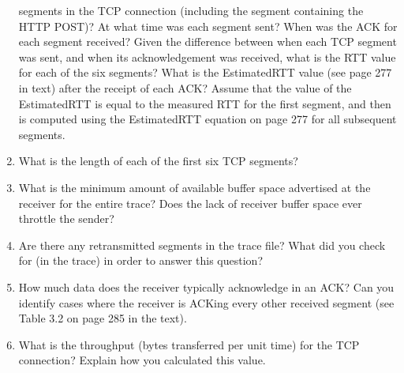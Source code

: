 \documentclass[10pt]{article}
\begin{document}
\begin{enumerate}
{  segments in the TCP connection (including the segment containing the
  HTTP POST)? At what time was each segment sent? When was the ACK for each
  segment received? Given the difference between when each TCP segment was
  sent, and when its acknowledgement was received, what is the RTT value for
  each of the six segments? What is the EstimatedRTT value (see page 277 in
  text) after the receipt of each ACK? Assume that the value of the
  EstimatedRTT is equal to the measured RTT for the first segment, and then
  is computed using the EstimatedRTT equation on page 277 for all subsequent
  segments.}
  \item{What is the length of each of the first six TCP segments?}
  \item{What is the minimum amount of available buffer space advertised at
    the receiver for the entire trace? Does the lack of receiver buffer space
    ever throttle the sender?}
  \item{Are there any retransmitted segments in the trace file? What did you
    check for (in the trace) in order to answer this question?}
  \item{How much data does the receiver typically acknowledge in an ACK?
    Can you identify cases where the receiver is ACKing every other
    received segment (see Table 3.2 on page 285 in the text).}
  \item{What is the throughput (bytes transferred per unit time)
    for the TCP connection? Explain how you calculated this value.}
\end{enumerate}
\end{document}
